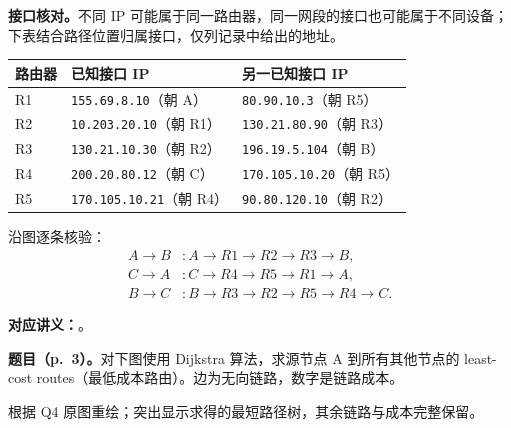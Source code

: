 \begin{checkedsolution}
\textbf{接口核对。}不同 IP 可能属于同一路由器，同一网段的接口也可能属于不同设备；下表结合路径位置归属接口，仅列记录中给出的地址。
\begin{center}
\small
\begin{tabular}{@{}lll@{}}
\toprule
路由器 & 已知接口 IP & 另一已知接口 IP \\
\midrule
R1 & \texttt{155.69.8.10}（朝 A） & \texttt{80.90.10.3}（朝 R5） \\
R2 & \texttt{10.203.20.10}（朝 R1） & \texttt{130.21.80.90}（朝 R3） \\
R3 & \texttt{130.21.10.30}（朝 R2） & \texttt{196.19.5.104}（朝 B） \\
R4 & \texttt{200.20.80.12}（朝 C） & \texttt{170.105.10.20}（朝 R5） \\
R5 & \texttt{170.105.10.21}（朝 R4） & \texttt{90.80.120.10}（朝 R2） \\
\bottomrule
\end{tabular}
\end{center}

沿图逐条核验：
\[
\begin{aligned}
 A\to B &: A\to R1\to R2\to R3\to B,\\
 C\to A &: C\to R4\to R5\to R1\to A,\\
 B\to C &: B\to R3\to R2\to R5\to R4\to C.
\end{aligned}
\]
\end{checkedsolution}

\textbf{对应讲义：}。

\textbf{题目（p.~3）。}对下图使用 Dijkstra 算法，求源节点 A 到所有其他节点的 least-cost routes（最低成本路由）。边为无向链路，数字是链路成本。

\begin{center}


{\footnotesize 根据 Q4 原图重绘；突出显示求得的最短路径树，其余链路与成本完整保留。}
\end{center}

